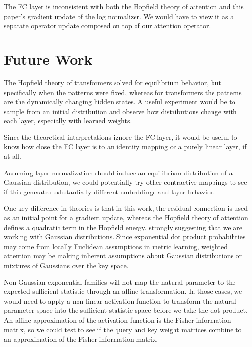 \documentclass{article}
\begin{document}
The FC layer is inconsistent with both the Hopfield theory of attention and this paper's gradient update of the log normalizer. We would have to view it as a separate operator update composed on top of our attention operator.

\section{Future Work}
\label{future work}
The Hopfield theory of transformers solved for equilibrium behavior, but specifically when the patterns were fixed, whereas for transformers the patterns are the dynamically changing hidden states.
A useful experiment would be to sample from an initial distribution and observe how distributions change with each layer, especially with learned weights.

Since the theoretical interpretations ignore the FC layer, it would be useful to know how close the FC layer is to an identity mapping or a purely linear layer, if at all.

Assuming layer normalization should induce an equilibrium distribution of a Gaussian distribution, we could potentially try other contractive mappings to see if this generates substantially different embeddings and layer behavior.

One key difference in theories is that in this work, the residual connection is used as an initial point for a gradient update, whereas the Hopfield theory of attention defines a quadratic term in the Hopfield energy, strongly suggesting that we are working with Gaussian distributions. 
Since exponential dot product probabilities may come from locally Euclidean assumptions in metric learning, weighted attention may be making inherent assumptions about Gaussian distributions or mixtures of Gaussians over the key space.

Non-Gaussian exponential families will not map the natural parameter to the expected sufficient statistic through an affine transformation. In those cases, we would need to apply a non-linear activation function to transform the natural parameter space into the sufficient statistic space before we take the dot product. An affine approximation of the activation function is the Fisher information matrix, so we could test to see if the query and key weight matrices combine to an approximation of the Fisher information matrix.



\end{document}
